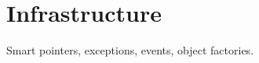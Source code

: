 \chapter{Infrastructure}
\label{chapter:Infrastructure}

Smart pointers, exceptions, events, object factories.
